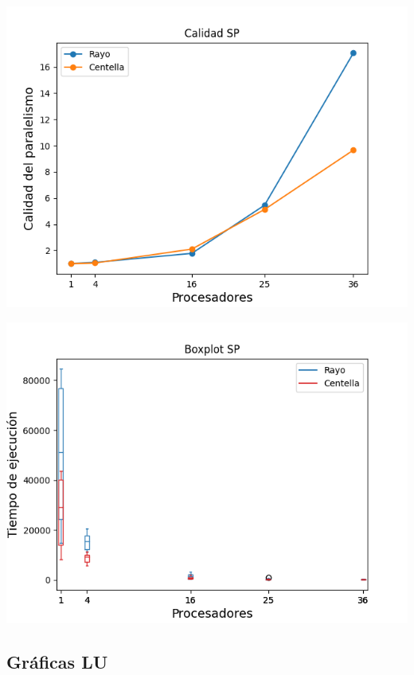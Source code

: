 \begin{center}
 \centering
 \begin{minipage}[b]{.49\textwidth}
  \includegraphics[width=1\linewidth]{plots/calidad-sp.png}
 \end{minipage}
 \begin{minipage}[b]{.49\textwidth}
  \includegraphics[width=1\linewidth]{plots/boxplot-sp.png}
 \end{minipage}
\end{center}

\newpage

\subsection{Gráficas LU}

